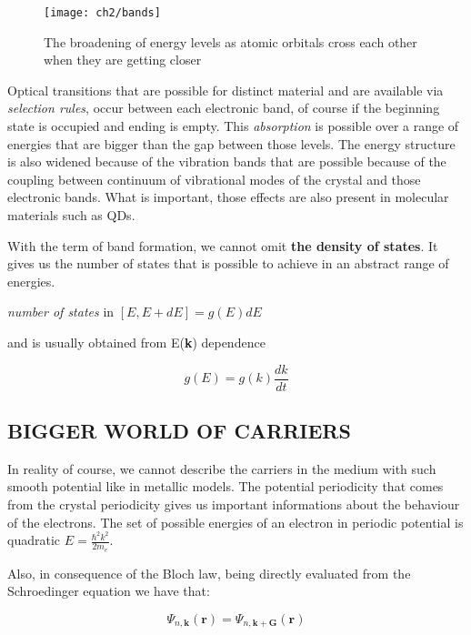 \begin{figure}[H]
\centering
\texttt{[image: ch2/bands]}
\caption{The broadening of energy levels as atomic orbitals cross each other when they are getting closer\cite{fox}}
\end{figure}

Optical transitions that are possible for distinct material and are available via \textit{selection rules}, occur between each electronic band, of course if the beginning state is occupied and ending is empty. This \textit{absorption} is possible over a range of energies that are bigger than the gap between those levels. The energy structure is also widened because of the vibration bands that are possible because of the coupling between continuum of vibrational modes of the crystal and those electronic bands. What is important, those effects are also present in molecular materials such as QDs.

With the term of band formation, we cannot omit \textbf{the density of states}. It gives us the number of states that is possible to achieve in an abstract range of energies.

\begin{center}
\textit{number of states} in $[E,E+dE] = g(E)dE$
\end{center}


and is usually obtained from E(\textbf{k}) dependence

\begin{equation}
g(E) = g(k)\frac{dk}{dt}
\end{equation}

\subsection{BIGGER WORLD OF CARRIERS}
In reality of course, we cannot describe the carriers in the medium with such smooth potential like in metallic models. The potential periodicity that comes from the crystal periodicity gives us important informations about the behaviour of the electrons. The set of possible energies of an electron in periodic potential is quadratic $E=\frac{\hbar ^2k^2}{2m_e}$.


Also, in consequence of the Bloch law, being directly evaluated from the Schroedinger equation we have that:

\begin{equation}
\Psi _{n,\mathbf{k}}(\mathbf{r}) = \Psi _{n,\mathbf{k}+\mathbf{G}}(\mathbf{r})
\end{equation}

